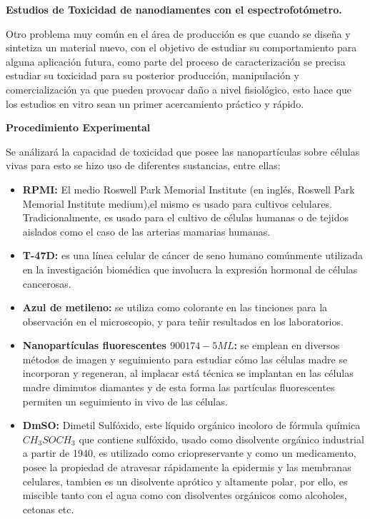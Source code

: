 \textbf{Estudios de Toxicidad de nanodiamentes con el espectrofotómetro.}

Otro problema muy común en el área de producción es que cuando se diseña y sintetiza un material nuevo, con el objetivo de estudiar su comportamiento para alguna aplicación futura, como parte del proceso de caracterización se precisa estudiar su toxicidad para su posterior producción, manipulación y comercialización ya que pueden provocar daño a nivel fisiológico, esto hace que los estudios en vitro sean un primer acercamiento práctico y rápido.

\textbf{\textcolor{azul50}{Procedimiento Experimental}}

Se análizará la capacidad de toxicidad que posee las nanopartículas sobre células vivas para esto se hizo uso de diferentes sustancias, entre ellas:

\begin{itemize}
    \item \textbf{\textcolor{morado}{RPMI:}} El medio Roswell Park Memorial Institute (en inglés, Roswell Park Memorial Institute medium),el mismo es usado para cultivos celulares. Tradicionalmente, es usado para el cultivo de células humanas o de tejidos aislados como el caso de las arterias mamarias humanas.
    \item \textbf{\textcolor{morado}{T-47D:}} es una línea celular de cáncer de seno humano comúnmente utilizada en la investigación biomédica que involucra la expresión hormonal de células cancerosas.
    \item \textbf{\textcolor{morado}{Azul de metileno:}} 
    se utiliza como colorante en las tinciones para la observación en el microscopio, y para teñir resultados en los laboratorios.
    \item \textbf{\textcolor{morado}{Nanopartículas fluorescentes $900174-5ML$:}} se emplean en diversos métodos de imagen y seguimiento para estudiar cómo las células madre se incorporan y regeneran, al implacar está técnica se implantan en las células madre diminutos diamantes y de esta forma las partículas fluorescentes permiten un seguimiento in vivo de las células.
    \item \textbf{\textcolor{morado}{DmSO:}} Dimetil Sulfóxido, este líquido orgánico incoloro de fórmula química $CH_3SOCH_3$ que contiene sulfóxido, usado como disolvente orgánico industrial a partir de 1940, es utilizado como criopreservante y como un medicamento, posee la propiedad de atravesar rápidamente la epidermis y las membranas celulares, tambien es un disolvente aprótico y altamente polar, por ello, es miscible tanto con el agua como con disolventes orgánicos como alcoholes, cetonas etc. 
\end{itemize}

